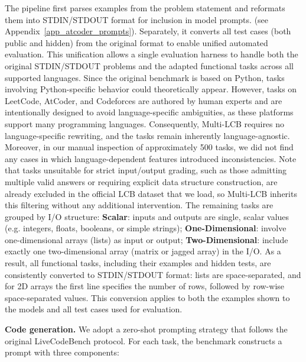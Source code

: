\documentclass{article} %
\begin{document}
The pipeline first parses examples from the problem statement and reformats them into STDIN/STDOUT format for inclusion in model prompts. (see Appendix~\ref{app_atcoder_prompts}). Separately, it converts all test cases (both public and hidden) from the original format to enable unified automated evaluation. This unification allows a single evaluation harness to handle both the original STDIN/STDOUT problems and the adapted functional tasks across all supported languages. 
Since the original benchmark is based on Python, tasks involving Python-specific behavior could theoretically appear. However, tasks on LeetCode, AtCoder, and Codeforces are authored by human experts and are intentionally designed to avoid language-specific ambiguities, as these platforms support many programming languages. Consequently, Multi-LCB requires no language-specific rewriting, and the tasks remain inherently language-agnostic. Moreover, in our manual inspection of approximately 500 tasks, we did not find any cases in which language-dependent features introduced inconsistencies.
Note that tasks unsuitable for strict input/output grading, such as those admitting multiple valid answers or requiring explicit data structure construction, are already excluded in the official LCB dataset that we load, so Multi-LCB inherits this filtering without any additional intervention. The remaining tasks are grouped by I/O structure:
\textbf{Scalar}: inputs and outputs are single, scalar values (e.g. integers, floats, booleans, or simple strings); \textbf{One-Dimensional}: involve one-dimensional arrays (lists) as input or output; \textbf{Two-Dimensional}: include exactly one two-dimensional array (matrix or jagged array) in the I/O. As a result, all functional tasks, including their examples and hidden tests, are consistently converted to STDIN/STDOUT format: lists are space-separated, and for 2D arrays the first line specifies the number of rows, followed by row-wise space-separated values. This conversion applies to both the examples shown to the models and all test cases used for evaluation.


\textbf{Code generation.} We adopt a zero-shot prompting strategy that follows the original LiveCodeBench protocol.
For each task, the benchmark constructs a prompt with three components:
\end{document}
